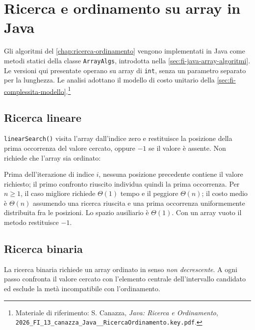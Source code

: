 \chapter{Ricerca e ordinamento su array in Java}
\label{chap:ricerca-ordinamento-java}

Gli algoritmi del \cref{chap:ricerca-ordinamento} vengono
implementati in Java come metodi statici della classe
\texttt{ArrayAlgs}, introdotta nella
\cref{sec:fi-java-array-algoritmi}. Le versioni qui presentate
operano su array di \texttt{int}, senza un parametro separato
per la lunghezza. Le analisi adottano il modello di costo
unitario della \cref{sec:fi-complessita-modello}.\footnote{Materiale
di riferimento: S. Canazza, \emph{Java: Ricerca e Ordinamento},
\nolinkurl{2026_FI_13_canazza_Java__RicercaOrdinamento.key.pdf}.}

\section{Ricerca lineare}
\label{sec:fi-java-alg-lineare}

\texttt{linearSearch()} visita l'array dall'indice zero e restituisce
la posizione della prima occorrenza del valore cercato, oppure
\(-1\) se il valore è assente. Non richiede che l'array sia ordinato:

\noindent
\begin{minipage}{\linewidth}

\end{minipage}

Prima dell'iterazione di indice \(i\), nessuna posizione precedente
contiene il valore richiesto; il primo confronto riuscito individua
quindi la prima occorrenza. Per \(n\ge1\), il caso migliore richiede
\(\Theta(1)\) tempo e il peggiore \(\Theta(n)\); il costo medio è
\(\Theta(n)\) assumendo una ricerca riuscita e una prima
occorrenza uniformemente distribuita fra le posizioni.
Lo spazio ausiliario è \(\Theta(1)\). Con un array vuoto il metodo restituisce \(-1\).

\section{Ricerca binaria}
\label{sec:fi-java-alg-binaria}

La ricerca binaria richiede un array ordinato in senso
\emph{non decrescente}. A ogni passo confronta il valore cercato
con l'elemento centrale dell'intervallo candidato ed esclude la
metà incompatibile con l'ordinamento.

